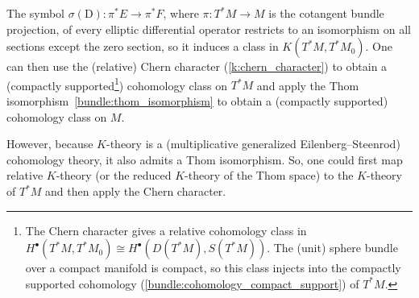 
    The symbol $\sigma(\mathrm{D}):\pi^*E\rightarrow\pi^*F$, where $\pi:T^*M\rightarrow M$ is the cotangent bundle projection, of every elliptic differential operator restricts to an isomorphism on all sections except the zero section, so it induces a class in $K(T^*M,T^*M_0)$. One can then use the (relative) Chern character (\cref{k:chern_character}) to obtain a (compactly supported\footnote{The Chern character gives a relative cohomology class in $H^\bullet(T^*M,T^*M_0)\cong H^\bullet(D(T^*M),S(T^*M))$. The (unit) sphere bundle over a compact manifold is compact, so this class injects into the compactly supported cohomology (\cref{bundle:cohomology_compact_support}) of $T^*M$.}) cohomology class on $T^*M$ and apply the Thom isomorphism~\ref{bundle:thom_isomorphism} to obtain a (compactly supported) cohomology class on $M$.

    However, because $K$-theory is a (multiplicative generalized Eilenberg--Steenrod) cohomology theory, it also admits a Thom isomorphism. So, one could first map relative $K$-theory (or the reduced $K$-theory of the Thom space) to the $K$-theory of $T^*M$ and then apply the Chern character.

